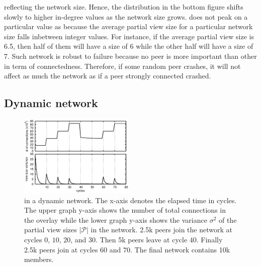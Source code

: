 \begin{asparadesc}
  reflecting the network size. Hence, the distribution in the bottom figure
  shifts slowly to higher in-degree values as the network size grows.  \SPRAY
  does not peak on a particular value as \CYCLON because the average partial
  view size for a particular network size falls inbetween integer values. For
  instance, if the average partial view size is 6.5, then half of them will
  have a size of 6 while the other half will have a size of 7. Such network is
  robust to failure because no peer is more important than other in term of
  connectedness. Therefore, if some random peer crashes, it will not affect as
  much the network as if a peer strongly connected crashed.
\end{asparadesc}

\subsection{Dynamic network}

\begin{figure}
  \centering
  \includegraphics[width=0.49\textwidth]{img/churn.eps}
  \caption{\label{fig:churn}\SPRAY in a dynamic network. The x-axis denotes the
    elapsed time in cycles. The upper graph y-axis shows the number of total
    connections in the overlay while the lower graph y-axis shows the variance
    $\sigma^2$ of the partial view sizes $|\mathcal{P}|$ in the network.  2.5k
    peers join the network at cycles $0$, $10$, $20$, and $30$. Then 5k peers
    leave at cycle $40$. Finally 2.5k peers join at cycles $60$ and $70$. The
    final network contains 10k members.}
\end{figure}

